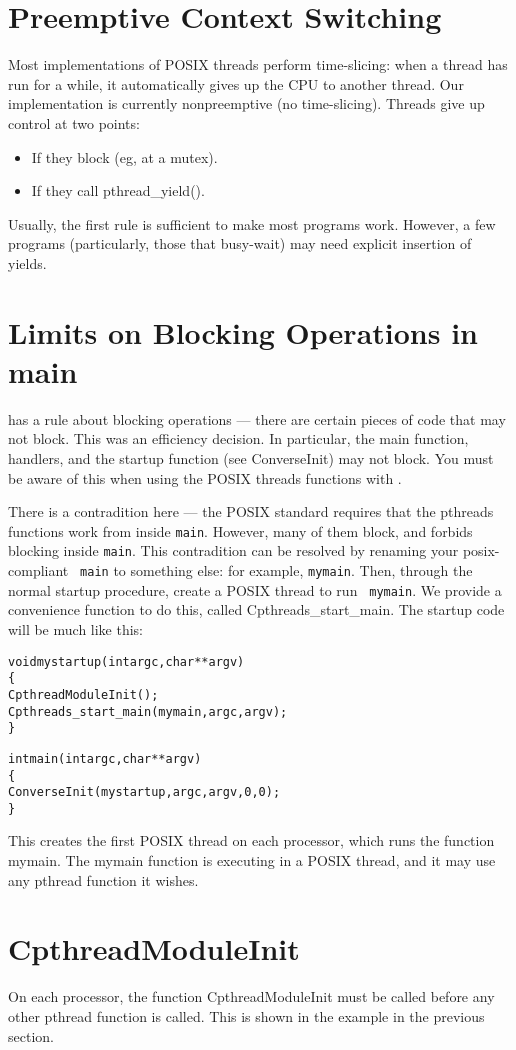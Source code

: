 \section{Preemptive Context Switching}

Most implementations of POSIX threads perform time-slicing: when a thread
has run for a while, it automatically gives up the CPU to another thread.
Our implementation is currently nonpreemptive (no time-slicing).  Threads
give up control at two points:

\begin{itemize}
\item{If they block (eg, at a mutex).}
\item{If they call pthread\_yield().}
\end{itemize}

Usually, the first rule is sufficient to make most programs work.
However, a few programs (particularly, those that busy-wait) may need
explicit insertion of yields.

\section{Limits on Blocking Operations in main}

\converse{} has a rule about blocking operations --- there are certain
pieces of code that may not block.  This was an efficiency decision.
In particular, the main function, \converse{} handlers, and the \converse{}
startup function (see ConverseInit) may not block.  You must be aware
of this when using the POSIX threads functions with \converse{}.

There is a contradition here --- the POSIX standard requires that the
pthreads functions work from inside {\tt main}.  However, many of them
block, and \converse{} forbids blocking inside {\tt main}.  This
contradition can be resolved by renaming your posix-compliant {\tt
main} to something else: for example, {\tt mymain}.  Then, through the
normal \converse{} startup procedure, create a POSIX thread to run {\tt
mymain}.  We provide a convenience function to do this, called
Cpthreads\_start\_main.  The startup code will be much like this:

\begin{alltt}
void mystartup(int argc, char **argv)
\{
  CpthreadModuleInit();
  Cpthreads_start_main(mymain, argc, argv);
\}

int main(int argc, char **argv)
\{
  ConverseInit(mystartup, argc, argv, 0, 0);
\}
\end{alltt}

This creates the first POSIX thread on each processor, which runs the
function mymain.  The mymain function is executing in a POSIX thread,
and it may use any pthread function it wishes.

\section{CpthreadModuleInit}

On each processor, the function CpthreadModuleInit must be called
before any other pthread function is called.  This is shown in the
example in the previous section.
